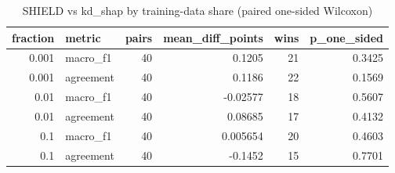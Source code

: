 \begin{table}
\caption{SHIELD vs kd_shap by training-data share (paired one-sided Wilcoxon)}
\begin{tabular}{rlrrrr}
\toprule
fraction & metric & pairs & mean_diff_points & wins & p_one_sided \\
\midrule
0.001 & macro_f1 & 40 & 0.1205 & 21 & 0.3425 \\
0.001 & agreement & 40 & 0.1186 & 22 & 0.1569 \\
0.01 & macro_f1 & 40 & -0.02577 & 18 & 0.5607 \\
0.01 & agreement & 40 & 0.08685 & 17 & 0.4132 \\
0.1 & macro_f1 & 40 & 0.005654 & 20 & 0.4603 \\
0.1 & agreement & 40 & -0.1452 & 15 & 0.7701 \\
\bottomrule
\end{tabular}
\end{table}
